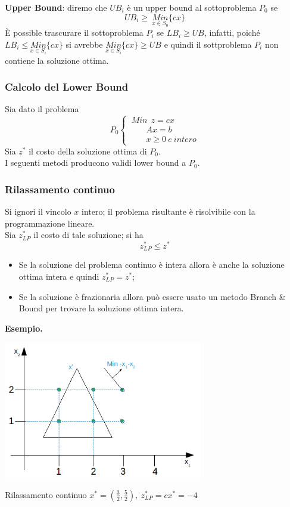 \textbf{Upper Bound}: diremo che $UB_{i}$ è un upper bound al sottoproblema $P_{0}$ se
\begin{equation*}
UB_{i}\ge\ \underset{x\in S_{0}}{Min}\{cx\}
\end{equation*}
È possible trascurare il sottoproblema $P_{i}$ se $LB_{i}\ge UB$, infatti, poiché $LB_{i}\le \underset{x\in S_{i}}{Min}\{cx\}$ si avrebbe $\underset{x\in S_{i}}{Min}\{cx\}\ge UB$ e quindi il sottproblema $P_{i}$ non contiene la soluzione ottima.
\clearpage

\subsubsection{Calcolo del Lower Bound}
Sia dato il problema
\begin{displaymath}
P_{0}
\begin{cases}
\ Min\ \ z=cx\\
\ \ \ \ \ \ \ \ \ A x = b\\
\ \ \ \ \ \ \ \ \ x \ge 0\ e\:intero
\end{cases}
\end{displaymath}
Sia $z^{*}$ il costo della soluzione ottima di $P_{0}$.\\
I seguenti metodi producono validi lower bound a $P_{0}$.

\subsubsection{Rilassamento continuo}

Si ignori il vincolo $x$ intero; il problema risultante è risolvibile con la programmazione lineare.\\
Sia $z_{LP}^{*}$ il costo di tale soluzione; si ha
\begin{equation*}
	z_{LP}^{*}\le z^{*}
\end{equation*}
\begin{itemize}
	\item Se la soluzione del problema continuo è intera allora è anche la soluzione ottima intera e quindi $z_{LP}^{*}=z^{*}$;
	\item Se la soluzione è frazionaria allora può essere usato un metodo Branch \& Bound per trovare la soluzione ottima intera.
\end{itemize}

\textbf{Esempio.}

\centerline{\includegraphics[height=6cm]{images/graph19.png}}
Rilassamento continuo $x^{*}=(\frac{3}{2},\frac{5}{2}),\ z_{LP}^{*}=cx^{*}=-4$

